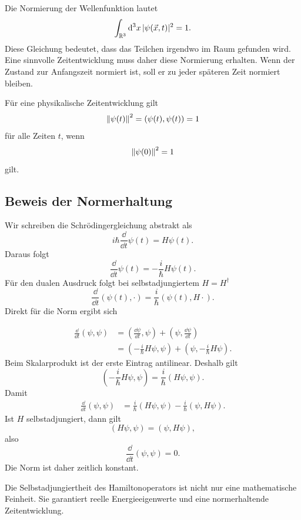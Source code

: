 Die Normierung der Wellenfunktion lautet
\[
    \int_{\mathbb{R}^3}\mathrm{d}^3x\,|\psi(\vec{x},t)|^2=1.
\]
Diese Gleichung bedeutet, dass das Teilchen irgendwo im Raum gefunden wird. Eine sinnvolle Zeitentwicklung muss daher diese Normierung erhalten. Wenn der Zustand zur Anfangszeit normiert ist, soll er zu jeder späteren Zeit normiert bleiben.

\begin{formulabox}
Für eine physikalische Zeitentwicklung gilt
\[
    \left\lVert \psi(t) \right\rVert^2=(\psi(t),\psi(t))=1
\]
für alle Zeiten $t$, wenn
\[
    \left\lVert \psi(0) \right\rVert^2=1
\]
gilt.
\end{formulabox}

\subsection{Beweis der Normerhaltung}

Wir schreiben die Schrödingergleichung abstrakt als
\[
    i\hbar\frac{\dd}{\dd t}\psi(t)=H\psi(t).
\]
Daraus folgt
\[
    \frac{\dd}{\dd t}\psi(t)=-\frac{i}{\hbar}H\psi(t).
\]
Für den dualen Ausdruck folgt bei selbstadjungiertem $H=H^\dagger$
\[
    \frac{\dd}{\dd t}(\psi(t),\cdot)
    =\frac{i}{\hbar}(\psi(t),H\cdot).
\]
Direkt für die Norm ergibt sich
\begin{derivationbox}
\[
\begin{aligned}
    \frac{\dd}{\dd t}(\psi,\psi)
    &=\left(\frac{\dd\psi}{\dd t},\psi\right)
      +\left(\psi,\frac{\dd\psi}{\dd t}\right) \\
    &=\left(-\frac{i}{\hbar}H\psi,\psi\right)
      +\left(\psi,-\frac{i}{\hbar}H\psi\right).
\end{aligned}
\]
Beim Skalarprodukt ist der erste Eintrag antilinear. Deshalb gilt
\[
    \left(-\frac{i}{\hbar}H\psi,\psi\right)
    =\frac{i}{\hbar}(H\psi,\psi).
\]
Damit
\[
\begin{aligned}
    \frac{\dd}{\dd t}(\psi,\psi)
    &=\frac{i}{\hbar}(H\psi,\psi)-\frac{i}{\hbar}(\psi,H\psi).
\end{aligned}
\]
Ist $H$ selbstadjungiert, dann gilt
\[
    (H\psi,\psi)=(\psi,H\psi),
\]
also
\[
    \frac{\dd}{\dd t}(\psi,\psi)=0.
\]
Die Norm ist daher zeitlich konstant.
\end{derivationbox}

\begin{conceptbox}
Die Selbstadjungiertheit des Hamiltonoperators ist nicht nur eine mathematische Feinheit. Sie garantiert reelle Energieeigenwerte und eine normerhaltende Zeitentwicklung.
\end{conceptbox}

